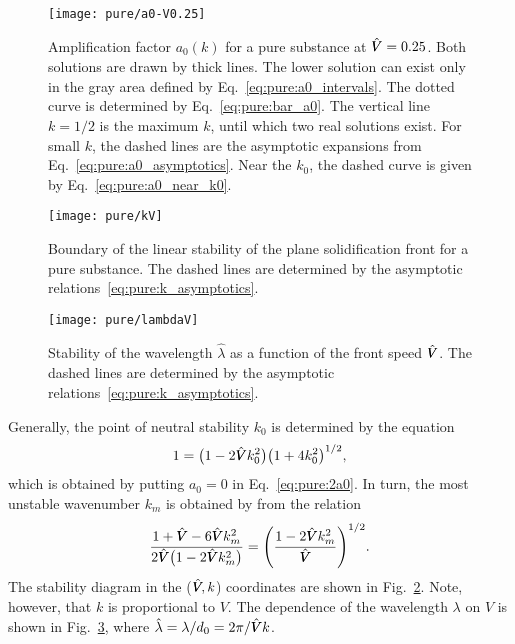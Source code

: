 \documentclass{article}
\newcommand{\hV}[1][\qty(\bar{V})]{\vphantom{#1}\mathrlap{\smash{\hat{V}}}V}
\begin{document}
\begin{figure}
    \centering
    \texttt{[image: pure/a0-V0.25]}
    \caption{
        Amplification factor $a_0(k)$ for a pure substance at $\hV=0.25$.
        Both solutions are drawn by thick lines.
        The lower solution can exist only in the gray area defined by Eq.~\eqref{eq:pure:a0_intervals}.
        The dotted curve is determined by Eq.~\eqref{eq:pure:bar_a0}.
        The vertical line $k=1/2$ is the maximum $k$, until which two real solutions exist.
        For small $k$, the dashed lines are the asymptotic expansions from Eq.~\eqref{eq:pure:a0_asymptotics}.
        Near the $k_0$, the dashed curve is given by Eq.~\eqref{eq:pure:a0_near_k0}.
    }\label{fig:pure:a0}
\end{figure}

\begin{figure}
    \centering
    \texttt{[image: pure/kV]}
    \caption{
        Boundary of the linear stability of the plane solidification front for a pure substance.
        The dashed lines are determined by the asymptotic relations~\eqref{eq:pure:k_asymptotics}.
    }\label{fig:pure:kV}
\end{figure}

\begin{figure}
    \centering
    \texttt{[image: pure/lambdaV]}
    \caption{
        Stability of the wavelength $\hat\lambda$ as a function of the front speed $\hV$.
        The dashed lines are determined by the asymptotic relations~\eqref{eq:pure:k_asymptotics}.
    }\label{fig:pure:lambdaV}
\end{figure}

Generally, the point of neutral stability $k_0$ is determined by the equation
\begin{equation}\label{eq:pure:marginal}
    1 = \qty(1-2\hV k_0^2)\qty(1+4k_0^2)^{1/2},
\end{equation}
which is obtained by putting $a_0=0$ in Eq.~\eqref{eq:pure:2a0}.
In turn, the most unstable wavenumber $k_m$ is obtained by from the relation
\begin{equation}\label{eq:pure:most}
    \frac{1+\hV-6\hV k_m^2}{2\hV\qty(1-2\hV k_m^2)} = \qty(\frac{1-2\hV k_m^2}{\hV})^{1/2}.
\end{equation}
The stability diagram in the ($\hV,k$) coordinates are shown in Fig.~\ref{fig:pure:kV}.
Note, however, that $k$ is proportional to $V$.
The dependence of the wavelength $\lambda$ on $V$ is shown in Fig.~\ref{fig:pure:lambdaV},
where $\hat\lambda = \lambda/d_0 = 2\pi/\hV k$.
\end{document}
